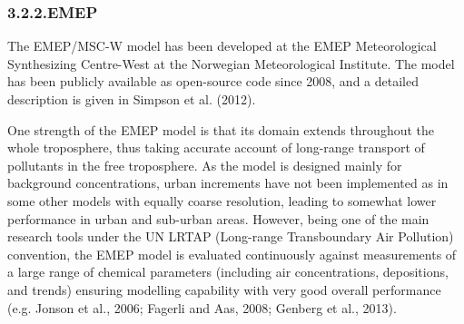 \documentclass[9pt]{report}
\begin{document}
\subsubsection{3.2.2.\hspace*{0.5em}EMEP}\label{sec-emep}%

\noindent{}The EMEP/MSC-W model has been developed at the EMEP Meteorological Synthesizing Centre-West at the Norwegian Meteorological Institute. 
The model has been publicly available as open-source code since 2008, and a detailed description is given in Simpson et al. (2012).%

One strength of the EMEP model is that its domain extends throughout the whole troposphere, thus taking accurate account of long-range transport of pollutants in the free troposphere. 
As the model is designed mainly for background concentrations, urban increments have not been implemented as in some other models with equally coarse resolution, leading to somewhat lower performance in urban and sub-urban areas. 
However, being one of the main research tools under the UN LRTAP (Long-range Transboundary Air Pollution) convention, the EMEP model is evaluated continuously against measurements of a large range of chemical parameters (including air concentrations, depositions, and trends) ensuring modelling capability with very good overall performance (e.g. Jonson et al., 2006; Fagerli and Aas, 2008; Genberg et al., 2013).%
\end{document}
